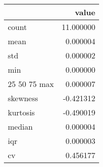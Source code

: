 \begin{tabular}{lr}
\toprule
 & value \\
\midrule
count & 11.000000 \\
mean & 0.000004 \\
std & 0.000002 \\
min & 0.000000 \\
25%
50%
75%
max & 0.000007 \\
skewness & -0.421312 \\
kurtosis & -0.490019 \\
median & 0.000004 \\
iqr & 0.000003 \\
cv & 0.456177 \\
\bottomrule
\end{tabular}
